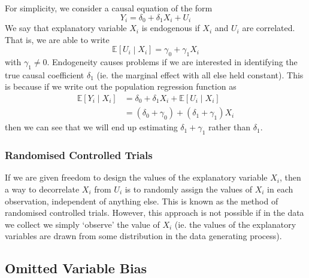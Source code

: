 \documentclass[11pt]{report} %
\begin{document}
For simplicity, we consider a causal equation of the form
\begin{equation}
Y_{i} = \delta_{0} + \delta_{1}X_{i} + U_{i}
\end{equation}
We say that explanatory variable $X_{i}$ is endogenous if $X_{i}$ and $U_{i}$ are correlated. That is, we are able to write
\begin{equation}
\mathbb{E}\left[U_{i}\middle| X_{i}\right] = \gamma_{0} + \gamma_{1}X_{i}
\end{equation}
with $\gamma_{1}\neq 0$. Endogeneity causes problems if we are interested in identifying the true causal coefficient $\delta_{1}$ (ie. the marginal effect with all else held constant). This is because if we write out the population regression function as
\begin{align}
\mathbb{E}\left[Y_{i}\middle|X_{i}\right] &= \delta_{0} + \delta_{1}X_{i} + \mathbb{E}\left[U_{i}\middle| X_{i}\right] \\
&= \left(\delta_{0} + \gamma_{0}\right) + \left(\delta_{1} + \gamma_{1}\right)X_{i}
\end{align}
then we can see that we will end up estimating $\delta_{1} + \gamma_{1}$ rather than $\delta_{1}$.

\subsubsection{Randomised Controlled Trials}

If we are given freedom to design the values of the explanatory variable $X_{i}$, then a way to decorrelate $X_{i}$ from $U_{i}$ is to randomly assign the values of $X_{i}$ in each observation, independent of anything else. This is known as the method of randomised controlled trials. However, this approach is not possible if in the data we collect we simply `observe' the value of $X_{i}$ (ie. the values of the explanatory variables are drawn from some distribution in the data generating process).

\subsection{Omitted Variable Bias}
\end{document}
